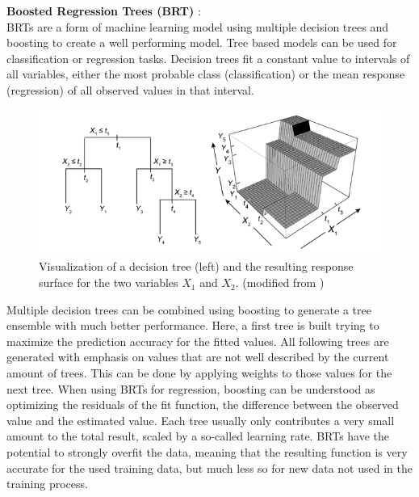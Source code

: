 \documentclass[12pt,a4paper]{article}
\begin{document}
\textbf{Boosted Regression Trees (BRT)} \autocite{elith2008brt}:\\
BRTs are a form of machine learning model using multiple decision trees and boosting to create a well performing model.
Tree based models can be used for classification or regression tasks.
Decision trees fit a constant value to intervals of all variables, either the most probable class (classification) or the mean response (regression) of all observed values in that interval.
\begin{figure}[!h]
    \centering
    \includegraphics[width = 0.95\linewidth]{figures/elith-brt.png}
    \caption{\label{fig:elith_brt} Visualization of a decision tree (left) and the resulting response surface for the two variables $X_1$ and $X_2$. (modified from \autocite{elith2008brt})}
\end{figure}

Multiple decision trees can be combined using boosting to generate a tree ensemble with much better performance.
Here, a first tree is built trying to maximize the prediction accuracy for the fitted values.
All following trees are generated with emphasis on values that are not well described by the current amount of trees.
This can be done by applying weights to those values for the next tree.
When using BRTs for regression, boosting can be understood as optimizing the residuals of the fit function, the difference between the observed value and the estimated value.
Each tree usually only contributes a very small amount to the total result, scaled by a so-called learning rate.
BRTs have the potential to strongly overfit the data, meaning that the resulting function is very accurate for the used training data, but much less so for new data not used in the training process.
\end{document}
